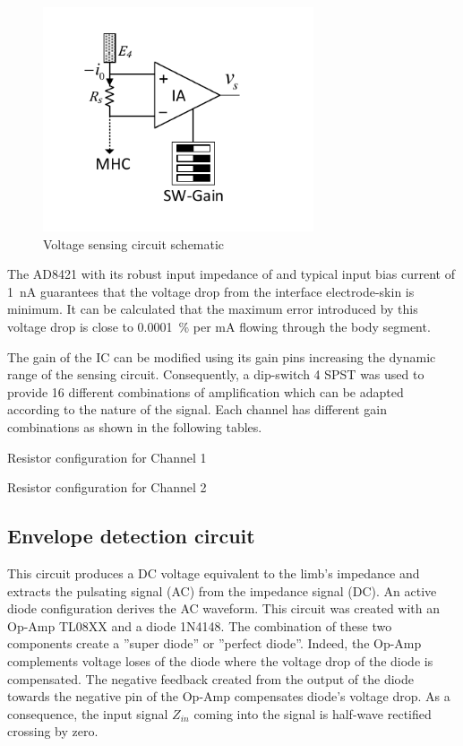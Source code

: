 \begin{figure}[!htpb]
	\centering
	\includegraphics[width=8cm,keepaspectratio]{figure4}
    \caption{Voltage sensing circuit schematic}
    \label{fig:sensing}
\end{figure}

The AD8421\cite{ad:AD8421} with its robust input impedance of and typical input bias current of \SI{1}{\nA} guarantees that the voltage drop from the interface electrode-skin is minimum. It can be calculated that the maximum error introduced by this voltage drop is close to \SI{0.0001}{\percent} per mA flowing through the body segment. 

The gain of the IC can be modified using its gain pins increasing the dynamic range of the sensing circuit. Consequently, a dip-switch 4 SPST was used to provide 16 different combinations of amplification which can be adapted according to the nature of the signal. Each channel has different gain combinations as shown in the following tables.

\begin{table}
    \label{tbl:rch1}
    \caption{Resistor configuration for Channel 1}
\end{table} 

\begin{table}
    \label{tbl:rch2}
    \caption{Resistor configuration for Channel 2}
\end{table} 


\subsection{Envelope detection circuit}
This circuit produces a DC voltage equivalent to the limb's impedance and extracts the pulsating signal (AC) from the impedance signal (DC). An active diode configuration derives the AC waveform. This circuit was created with an Op-Amp TL08XX\cite{ti:TL08xx} and a diode 1N4148. The combination of these two components create a ''super diode'' or ''perfect diode''. Indeed, the Op-Amp complements voltage loses of the diode where the voltage drop of the diode is compensated. The negative feedback created from the output of the diode towards the negative pin of the Op-Amp compensates diode's voltage drop. As a consequence, the input signal $Z_{in}$ coming into the signal is half-wave rectified crossing by zero. 

